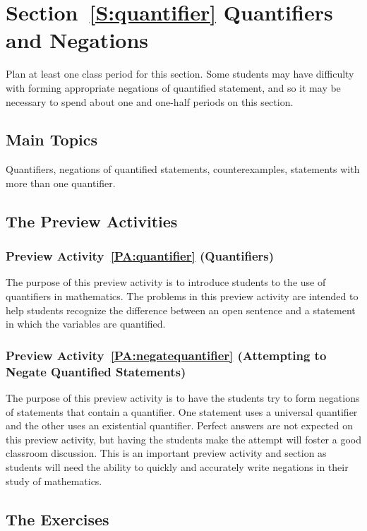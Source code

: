 \section*{Section~\ref{S:quantifier} Quantifiers and Negations}
Plan at least one class period for this section.  Some students may have difficulty with forming appropriate negations of quantified statement, and so it may be necessary to spend about one and one-half periods on this section.


\subsection*{Main Topics}
Quantifiers, negations of quantified statements, counterexamples, statements with more than one quantifier.

\subsection*{The Preview Activities}
\subsubsection*{Preview Activity~\ref{PA:quantifier} (Quantifiers)} 
The purpose of this preview activity is to introduce students to the use of quantifiers in mathematics.  The problems in this preview activity are intended to help students recognize the difference between an open sentence and a statement in which the variables are quantified.

%

\subsubsection*{Preview Activity~\ref{PA:negatequantifier} (Attempting to Negate Quantified Statements)}  
The purpose of this preview activity is to have the students try to form negations of statements that contain a quantifier.  One statement uses a universal quantifier and the other uses an existential quantifier.  Perfect answers are not expected on this preview activity, but having the students make the attempt will foster a good classroom discussion.    This is an important preview activity and section as students will need the ability to quickly and accurately write negations in their study of mathematics.
\hbreak




\subsection*{The Exercises}

